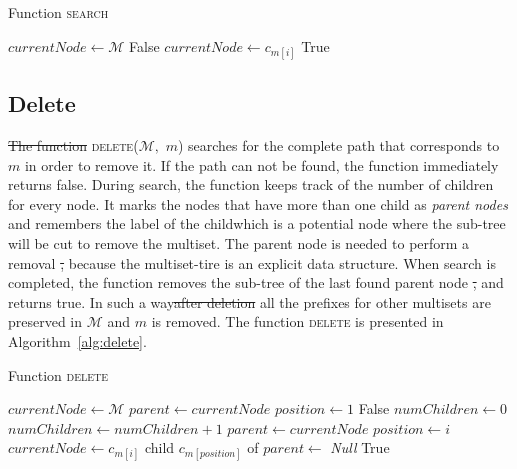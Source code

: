 \documentclass[10pt,letterpaper]{article}
\providecommand{\DIFaddtex}[1]{{\protect\color{blue}\uwave{#1}}} %
\providecommand{\DIFdeltex}[1]{{\protect\color{red}\sout{#1}}}                      %
\providecommand{\DIFaddbegin}{} %
\providecommand{\DIFaddend}{} %
\providecommand{\DIFdelbegin}{} %
\providecommand{\DIFdelend}{} %
\providecommand{\DIFadd}[1]{\texorpdfstring{\DIFaddtex{#1}}{#1}} %
\providecommand{\DIFdel}[1]{\texorpdfstring{\DIFdeltex{#1}}{}} %
\newcommand{\DIFscaledelfig}{0.5}
\newlength{\DIFdelgraphicswidth} %
\newlength{\DIFdelgraphicsheight} %
\newcommand{\DIFaddincludegraphics}[2][]{{\color{blue}\fbox{\DIFOincludegraphics[#1]{#2}}}} %
\newcommand{\DIFdelincludegraphics}[2][]{%
\sbox{\DIFdelgraphicsbox}{\DIFOincludegraphics[#1]{#2}}%
\settoboxwidth{\DIFdelgraphicswidth}{\DIFdelgraphicsbox} %
\settoboxtotalheight{\DIFdelgraphicsheight}{\DIFdelgraphicsbox} %
\scalebox{\DIFscaledelfig}{%
\parbox[b]{\DIFdelgraphicswidth}{\usebox{\DIFdelgraphicsbox}\\[-\baselineskip] \rule{\DIFdelgraphicswidth}{0em}}\llap{\resizebox{\DIFdelgraphicswidth}{\DIFdelgraphicsheight}{%
\setlength{\unitlength}{\DIFdelgraphicswidth}%
\begin{picture}(1,1)%
\thicklines\linethickness{2pt} %
{\color[rgb]{1,0,0}\put(0,0){\framebox(1,1){}}}%
{\color[rgb]{1,0,0}\put(0,0){\line( 1,1){1}}}%
{\color[rgb]{1,0,0}\put(0,1){\line(1,-1){1}}}%
\end{picture}%
}\hspace*{3pt}}} %
} %
\DeclareRobustCommand{\DIFaddbegin}{\DIFOaddbegin \let\includegraphics\DIFaddincludegraphics} %
\DeclareRobustCommand{\DIFaddend}{\DIFOaddend \let\includegraphics\DIFOincludegraphics} %
\DeclareRobustCommand{\DIFdelbegin}{\DIFOdelbegin \let\includegraphics\DIFdelincludegraphics} %
\DeclareRobustCommand{\DIFdelend}{\DIFOaddend \let\includegraphics\DIFOincludegraphics} %
\begin{document}
\begin{algorithm}[h!]
\caption{Function \textsc{search}}
\label{alg:search}
\begin{algorithmic}[1]
\State $currentNode \gets \mathcal{M}$
\State \Return False
\EndIf
\State $currentNode \gets c_{m[i]}$
\EndFor
\State \Return True
\EndFunction
\end{algorithmic}
\end{algorithm}

\subsection{Delete} \label{s:delete}
\DIFdelbegin \DIFdel{The function }\DIFdelend \DIFaddbegin \DIFadd{Function }\DIFaddend \textsc{delete}($\mathcal{M},$ $m$) searches for the complete path 
that corresponds to $m$ in order to remove it. If the path can not be found, the 
function immediately returns false. During \DIFaddbegin \DIFadd{the }\DIFaddend search, the function keeps track of the 
number of children for every node. It marks the nodes that have more than one child 
as \emph{parent nodes} and remembers the label of the child\DIFaddbegin \DIFadd{, }\DIFaddend which is a potential node 
where the sub-tree will be cut to remove the multiset. The parent node is needed to 
perform a removal \DIFdelbegin \DIFdel{, }\DIFdelend because the multiset-tire is an explicit data structure. When \DIFaddbegin \DIFadd{the }\DIFaddend search 
is completed, the function removes the sub-tree of the last found parent node \DIFdelbegin \DIFdel{, }\DIFdelend and 
returns true. In such a way\DIFdelbegin \DIFdel{after deletion }\DIFdelend \DIFaddbegin \DIFadd{, after deletion, }\DIFaddend all the prefixes for other multisets are 
preserved in $\mathcal{M}$ and $m$ is removed. The function \textsc{delete} is 
presented in Algorithm~\ref{alg:delete}.


\begin{algorithm}[h!]
\caption{Function \textsc{delete}}
\label{alg:delete}
\begin{algorithmic}[1]
\State $currentNode \gets \mathcal{M}$
\State $parent \gets currentNode$ 
\State $position \gets 1$
\State \Return False
\EndIf
\State $numChildren \gets 0$
\State $numChildren\gets numChildren+1$
\EndIf
\EndFor
{}
\State $parent\gets currentNode$
\State $position \gets i$
\EndIf
\State $currentNode \gets c_{m[i]}$
\EndFor
\State child $c_{m[position]}$ of $parent\gets$ \emph{Null}
\State \Return True
\EndFunction
\end{algorithmic}
\end{algorithm}
\end{document}
